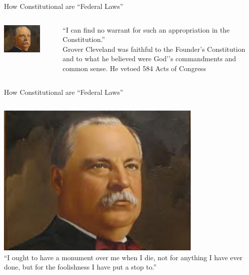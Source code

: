 \begin{frame}{How Constitutional are ``Federal Laws''}
    \begin{columns}[onlytextwidth]
            \centering
            \includegraphics[width=0.75\textwidth]{img/cleveland2.png} \\
            \pause

            ``I can find no warrant for such an appropriation in the Constitution.'' \\
            \vspace{15pt}
            Grover Cleveland was faithful to the Founder’s Constitution and to
            what he believed were God'’s commandments and common sense.  He
            vetoed 584 Acts of Congress

    \end{columns}
\end{frame}

\begin{frame}{How Constitutional are ``Federal Laws''}
    \begin{columns}[onlytextwidth]
            \centering
            \includegraphics[width=0.75\textwidth]{img/cleveland2.png} \\

            ``I ought to have a monument over me when I die, not for anything I have ever done, but for the foolishness I have put a stop to.''

    \end{columns}
\end{frame}

